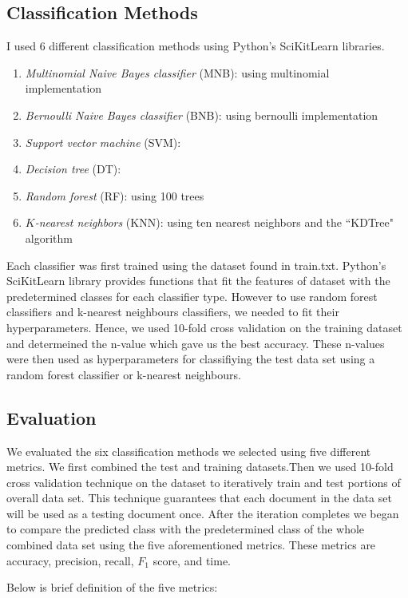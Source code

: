 \documentclass{article} %
\begin{document}
\subsection{Classification Methods}
I used 6 different classification methods using Python's SciKitLearn libraries.\cite{Pedregosa2011}
\begin{enumerate}
\item \emph{Multinomial Naive Bayes classifier} (MNB): using multinomial implementation
\item \emph{Bernoulli Naive Bayes classifier} (BNB): using bernoulli implementation
\item \emph{Support vector machine} (SVM): 
\item \emph{Decision tree} (DT): 
\item \emph{Random forest} (RF): using 100 trees
\item \emph{$K$-nearest neighbors} (KNN): using ten nearest neighbors and the ``KDTree" algorithm
\end{enumerate}

Each classifier was first trained using the dataset found in train.txt. Python's SciKitLearn library provides functions that fit the features of dataset with the predetermined classes for each classifier type. However to use random forest classifiers and k-nearest neighbours classifiers, we needed to fit their hyperparameters. Hence, we used 10-fold cross validation on the training dataset  and determeined the n-value which gave us the best accuracy. These n-values were then used as hyperparameters for classifiying the test data set using a random forest classifier or k-nearest neighbours. 

\subsection{Evaluation}
We evaluated the six classification methods we selected using five different metrics. We first combined the test and training datasets.Then we used 10-fold cross validation technique on the dataset to iteratively train and test portions of overall data set. This technique guarantees that each document in the data set will be used as a testing document once. After the iteration completes we began to compare the predicted class with the predetermined class of the whole combined data set using the five aforementioned metrics. These metrics are accuracy, precision, recall, $F_1$ score, and time. 

Below is brief definition of the five metrics: 
\end{document}
